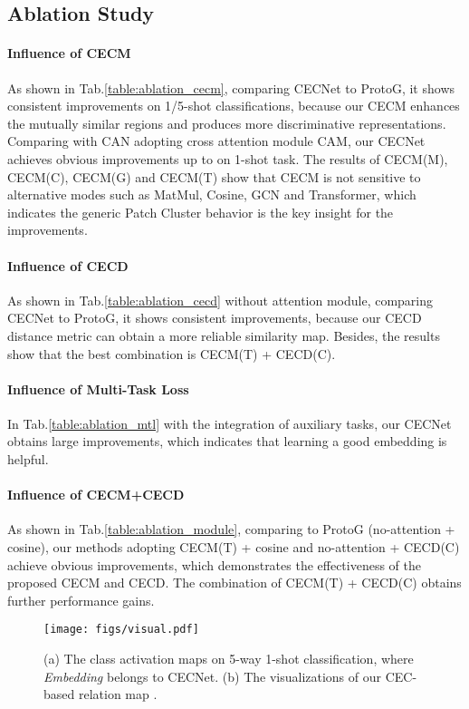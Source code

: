 \documentclass{article}
\begin{document}
\subsection{Ablation Study}
\paragraph{Influence of CECM}
As shown in Tab.\ref{table:ablation_cecm}, comparing CECNet to ProtoG, it shows consistent improvements on 1/5-shot classifications, because our CECM enhances the mutually similar regions and produces more discriminative representations. Comparing with CAN adopting cross attention module CAM, our CECNet achieves obvious improvements up to  on 1-shot task. The results of CECM(M), CECM(C), CECM(G) and CECM(T) show that CECM is not sensitive to alternative modes such as MatMul, Cosine, GCN and Transformer, which indicates the generic Patch Cluster behavior is the key insight for the improvements.


\paragraph{Influence of CECD}
As shown in Tab.\ref{table:ablation_cecd} without attention module, comparing CECNet to ProtoG, it shows consistent improvements, because our CECD distance metric can obtain a more reliable similarity map. Besides, the results show that the best combination is CECM(T) + CECD(C).

\paragraph{Influence of Multi-Task Loss}
In Tab.\ref{table:ablation_mtl} with the integration of auxiliary tasks, our CECNet obtains large improvements, which indicates that learning a good embedding is helpful.

\paragraph{Influence of CECM+CECD}
As shown in Tab.\ref{table:ablation_module}, comparing to ProtoG (no-attention + cosine), our methods adopting CECM(T) + cosine and no-attention + CECD(C) achieve obvious improvements, which demonstrates the effectiveness of the proposed CECM and CECD.
The combination of CECM(T) + CECD(C) obtains further performance gains.


\begin{figure}[!t]
\centering
\texttt{[image: figs/visual.pdf]}
\caption{(a) The class activation maps on 5-way 1-shot classification, where \textit{Embedding} belongs to CECNet.
(b) The visualizations of our CEC-based relation map .
}
\label{fig:visual}
\end{figure}
\end{document}
